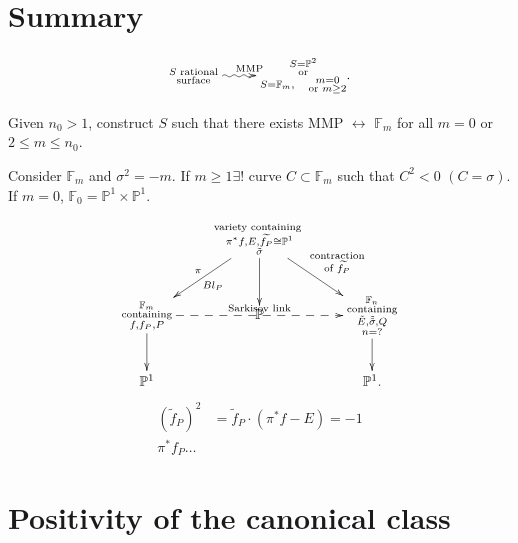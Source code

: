 \section{Summary}
\label{section-summary}

$$
\xymatrix{
\substack{S\text{ rational} \\
\text{surface}}
\ar@{~>}[r]^{\text{MMP}}
&  \substack{S=\mathbb{P}^2\\\text{or} \\
S=\mathbb{F}_m, \quad
\substack{m=0 \\ \text{or }m \geq 2}}.
}
$$

\begin{exercise}
\label{exercise-rational}
Given $n_0>1$,
construct $S$ such that there exists MMP
$\leftrightarrow$
$\mathbb{F}_m$ for all $m=0$ or $2 \leq  m
\leq  n_0$.
\end{exercise}

\medskip\noindent
Consider $\mathbb{F}_m$ and $\sigma^2=-m$.
If $m\geq 1 \exists !$ curve $C \subset
\mathbb{F}_m$
such that $C^2<0$  $(C=\sigma)$.
If $m=0$, $\mathbb{F}_0=\mathbb{P}^1 \times
\mathbb{P}^1$.


$$
\xymatrix{
&\substack{\text{variety containing }
\\\pi^*
f,E,\widetilde{f_P}\cong\mathbb{P}^1\\
\tilde{\sigma}}
\ar[dl]^{Bl_P}_\pi
\ar[dr]^{\substack{\text{contraction} \\
\text{of $\widetilde{f_P}$}}}
\ar[d]\\
\substack{\mathbb{F}_m \\
\text{containing}\\
f,f_P,P}
\ar[d]\ar@{-->}[rr]^{\text{Sarkisov link}}
&\mathbb{P}
&\substack{\mathbb{F}_n \\
\text{containing}\\
\tilde{E},\tilde{\tilde{\sigma}},Q\\
n=?}
\ar[d]\\
\mathbb{P}^1&& \mathbb{P}^1.
}
$$
$$
\begin{aligned}
(\tilde{f}_P)^2&=\tilde{f}_P\cdot(\pi^*f-E)=-
1\\
\pi^*f_P …
\end{aligned}
$$

\noindent
[Computations show that $n=m+1$.]

\section{Positivity of the canonical class }
\label{section-positivity-canonical}

